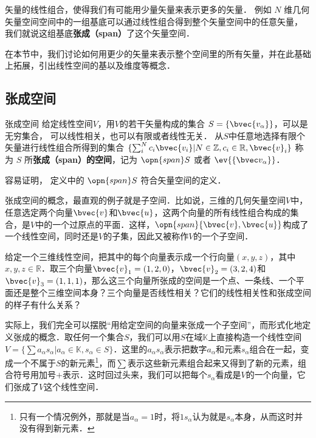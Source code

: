 


矢量的线性组合，使得我们有可能用少量矢量来表示更多的矢量． 例如 $N$ 维几何矢量空间空间中的一组基底可以通过线性组合得到整个矢量空间中的任意矢量， 我们就说这组基底\textbf{张成（span）}了这个矢量空间． 

在本节中，我们讨论如何用更少的矢量来表示整个空间里的所有矢量，并在此基础上拓展，引出线性空间的基以及维度等概念．

\subsection{张成空间}

\begin{definition}{张成空间}
给定线性空间$V$，用$V$的若干矢量构成的集合 $S=\{\bvec{v_\alpha}\}$，可以是无穷集合， 可以线性相关，也可以有限或者线性无关． 从$S$中任意地选择有限个矢量进行线性组合所得到的集合 $\{\sum_i^N c_i\bvec{v_i}|N\in\mathbb{Z}, c_i\in\mathbb{R}, \bvec{v}_i\}$ 称为 $S$ 所\textbf{张成（span）的空间}，记为 $\opn{span} S$ 或者 $\ev{\{\bvec v_\alpha\}}$．
\end{definition}
容易证明， 定义中的 $\opn{span} S$ 符合矢量空间的定义．

张成空间的概念，最直观的例子就是子空间．比如说，三维的几何矢量空间$V$中，任意选定两个向量$\bvec{v}$和$\bvec{u}$，这两个向量的所有线性组合构成的集合，是$V$中的一个过原点的平面．这样，$\opn{span}\{\bvec{v}, \bvec{u}\}$构成了一个线性空间，同时还是$V$的子集，因此又被称作$V$的一个子空间．

\begin{exercise}{}\label{VecSpn_exe1}
给定一个三维线性空间，把其中的每个向量表示成一个行向量$(x,y,z)$，其中$x,y,z\in\mathbb{R}$．取三个向量$\bvec{v}_1=(1,2,0)$，$\bvec{v}_2=(3,2,4)$和$\bvec{v}_3=(1,1,1)$，那么这三个向量所张成的空间是一个点、一条线、一个平面还是整个三维空间本身？三个向量是否线性相关？它们的线性相关性和张成空间的样子有什么关系？
\end{exercise}

实际上，我们完全可以摆脱“用给定空间的向量来张成一个子空间”，而形式化地定义张成的概念．取任何一个集合$S$，我们可以用$S$在域$\mathbb{K}$上直接构造一个线性空间$V=\{\sum a_\alpha s_\alpha|a_\alpha\in\mathbb{K}, s_\alpha\in S\}$．这里的$a_\alpha s_\alpha$表示把数字$a_\alpha$和元素$s_\alpha$组合在一起，变成一个不属于$S$的新元素\footnote{只有一个情况例外，那就是当$a_\alpha=1$时，将$1s_\alpha$认为就是$s_\alpha$本身，从而这时并没有得到新元素．}，而$\sum$表示这些新元素组合起来又得到了新的元素，组合符号用加号$+$表示．这时回过头来，我们可以把每个$s_\alpha$看成是$V$的一个向量，它们张成了$V$这个线性空间．

